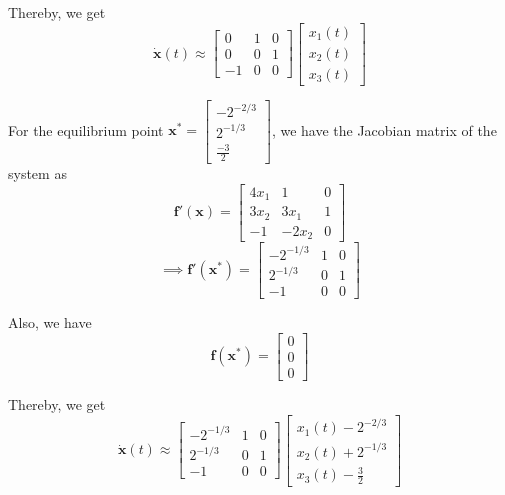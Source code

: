 Thereby, we get
\[
    \boxed{
        \mathbf{\dot x}(t) \approx
        \begin{bmatrix}
            0  & 1 & 0 \\
            0  & 0 & 1 \\
            -1 & 0 & 0
        \end{bmatrix}
        \begin{bmatrix}
            x_1(t) \\
            x_2(t) \\
            x_3(t)
        \end{bmatrix}
    }
\]

For the equilibrium point \( \mathbf{x^*} = \begin{bmatrix} -2^{-2/3} \\ 2^{-1/3} \\ \frac{-3}{2} \end{bmatrix} \), we have the Jacobian matrix of the system as
\[
    \mathbf{f'}(\mathbf{x}) =
    \begin{bmatrix}
        4x_1 & 1     & 0 \\
        3x_2 & 3x_1  & 1 \\
        -1   & -2x_2 & 0
    \end{bmatrix}
\]
\[
    \implies
    \mathbf{f'}(\mathbf{x^*}) =
    \begin{bmatrix}
        -2^{-1/3} & 1 & 0 \\
        2^{-1/3}  & 0 & 1 \\
        -1        & 0 & 0
    \end{bmatrix}
\]

Also, we have
\[
    \mathbf{f}(\mathbf{x^*}) =
    \begin{bmatrix}
        0 \\
        0 \\
        0
    \end{bmatrix}
\]

Thereby, we get
\[
    \boxed{
        \mathbf{\dot x}(t) \approx
        \begin{bmatrix}
            -2^{-1/3} & 1 & 0 \\
            2^{-1/3}  & 0 & 1 \\
            -1        & 0 & 0
        \end{bmatrix}
        \begin{bmatrix}
            x_1(t) - 2^{-2/3} \\
            x_2(t) + 2^{-1/3} \\
            x_3(t) - \frac{3}{2}
        \end{bmatrix}
    }
\]